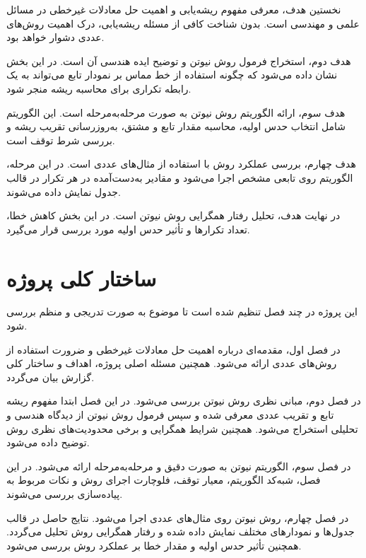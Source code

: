 نخستین هدف، معرفی مفهوم ریشه‌یابی و اهمیت حل معادلات غیرخطی در مسائل علمی و مهندسی است. بدون شناخت کافی از مسئله ریشه‌یابی، درک اهمیت روش‌های عددی دشوار خواهد بود.

هدف دوم، استخراج فرمول روش نیوتن و توضیح ایده هندسی آن است. در این بخش نشان داده می‌شود که چگونه استفاده از خط مماس بر نمودار تابع می‌تواند به یک رابطه تکراری برای محاسبه ریشه منجر شود.

هدف سوم، ارائه الگوریتم روش نیوتن به صورت مرحله‌به‌مرحله است. این الگوریتم شامل انتخاب حدس اولیه، محاسبه مقدار تابع و مشتق، به‌روزرسانی تقریب ریشه و بررسی شرط توقف است.

هدف چهارم، بررسی عملکرد روش با استفاده از مثال‌های عددی است. در این مرحله، الگوریتم روی تابعی مشخص اجرا می‌شود و مقادیر به‌دست‌آمده در هر تکرار در قالب جدول نمایش داده می‌شوند.

در نهایت هدف، تحلیل رفتار همگرایی روش نیوتن است. در این بخش کاهش خطا، تعداد تکرارها و تأثیر حدس اولیه مورد بررسی قرار می‌گیرد.

\section{ساختار کلی پروژه}

این پروژه در چند فصل تنظیم شده است تا موضوع به صورت تدریجی و منظم بررسی شود.

در فصل اول، مقدمه‌ای درباره اهمیت حل معادلات غیرخطی و ضرورت استفاده از روش‌های عددی ارائه می‌شود. همچنین مسئله اصلی پروژه، اهداف و ساختار کلی گزارش بیان می‌گردد.

در فصل دوم، مبانی نظری روش نیوتن بررسی می‌شود. در این فصل ابتدا مفهوم ریشه تابع و تقریب عددی معرفی شده و سپس فرمول روش نیوتن از دیدگاه هندسی و تحلیلی استخراج می‌شود. همچنین شرایط همگرایی و برخی محدودیت‌های نظری روش توضیح داده می‌شود.

در فصل سوم، الگوریتم نیوتن به صورت دقیق و مرحله‌به‌مرحله ارائه می‌شود. در این فصل، شبه‌کد الگوریتم، معیار توقف، فلوچارت اجرای روش و نکات مربوط به پیاده‌سازی بررسی می‌شوند.

در فصل چهارم، روش نیوتن روی مثال‌های عددی اجرا می‌شود. نتایج حاصل در قالب جدول‌ها و نمودارهای مختلف نمایش داده شده و رفتار همگرایی روش تحلیل می‌گردد. همچنین تأثیر حدس اولیه و مقدار خطا بر عملکرد روش بررسی می‌شود.
